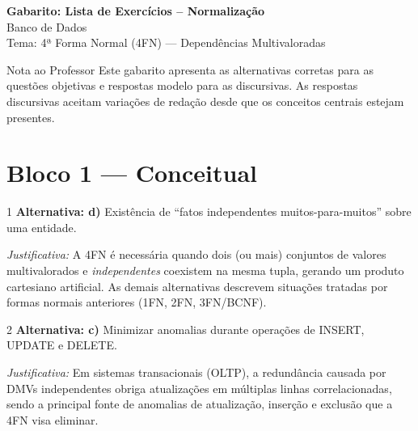 \documentclass[12pt]{article}
\begin{document}
\vspace*{0.2cm}
\begin{center}
  {\Large \textbf{Gabarito: Lista de Exercícios -- Normalização}}\\[0.2cm]
  {\large Banco de Dados}\\[0.2cm]
  Tema: 4ª Forma Normal (4FN) --- Dependências Multivaloradas
\end{center}

\vspace{0.3cm}

\begin{block}{Nota ao Professor}
Este gabarito apresenta as alternativas corretas para as questões objetivas e respostas modelo para as discursivas. As respostas discursivas aceitam variações de redação desde que os conceitos centrais estejam presentes.
\end{block}

\vspace{0.4cm}

\section*{Bloco 1 — Conceitual}

\begin{gabbox}{1}
\textbf{Alternativa: d)} Existência de ``fatos independentes muitos-para-muitos'' sobre uma entidade.

\smallskip
\textit{Justificativa:} A 4FN é necessária quando dois (ou mais) conjuntos de valores multivalorados e \emph{independentes} coexistem na mesma tupla, gerando um produto cartesiano artificial. As demais alternativas descrevem situações tratadas por formas normais anteriores (1FN, 2FN, 3FN/BCNF).
\end{gabbox}

\vspace{0.5cm}

\begin{gabbox}{2}
\textbf{Alternativa: c)} Minimizar anomalias durante operações de INSERT, UPDATE e DELETE.

\smallskip
\textit{Justificativa:} Em sistemas transacionais (OLTP), a redundância causada por DMVs independentes obriga atualizações em múltiplas linhas correlacionadas, sendo a principal fonte de anomalias de atualização, inserção e exclusão que a 4FN visa eliminar.
\end{gabbox}
\end{document}
